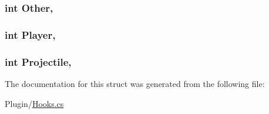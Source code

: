 \subsubsection[{Other}]{\setlength{\rightskip}{0pt plus 5cm}int Other\hspace{0.3cm}{\ttfamily [get]}, {\ttfamily [set]}}\label{structOTA_1_1Plugin_1_1HookArgs_1_1DeathMessage_ab86a6d759692d3823e3d50399f4f9eaf}
\hypertarget{structOTA_1_1Plugin_1_1HookArgs_1_1DeathMessage_ad8ab65f2594ec4b0f1682de80995c9a1}{}
\subsubsection[{Player}]{\setlength{\rightskip}{0pt plus 5cm}int Player\hspace{0.3cm}{\ttfamily [get]}, {\ttfamily [set]}}\label{structOTA_1_1Plugin_1_1HookArgs_1_1DeathMessage_ad8ab65f2594ec4b0f1682de80995c9a1}
\hypertarget{structOTA_1_1Plugin_1_1HookArgs_1_1DeathMessage_a81145d46bbb2d6b2901632788e65d28a}{}
\subsubsection[{Projectile}]{\setlength{\rightskip}{0pt plus 5cm}int Projectile\hspace{0.3cm}{\ttfamily [get]}, {\ttfamily [set]}}\label{structOTA_1_1Plugin_1_1HookArgs_1_1DeathMessage_a81145d46bbb2d6b2901632788e65d28a}


The documentation for this struct was generated from the following file\+:\begin{DoxyCompactItemize}
\item 
Plugin/\hyperlink{Hooks_8cs}{Hooks.\+cs}\end{DoxyCompactItemize}

